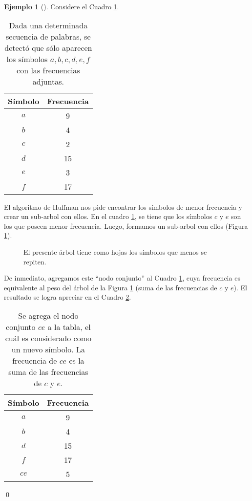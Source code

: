 \documentclass[english, spanish, fleqn, 10pt]{article}
\newcommand{\comillas}[1]{``#1''}
\numberwithin{equation}{section}
\theoremstyle{definition}
\newtheorem{beforeExample}{Ejemplo}[section]
\newenvironment{ejemplo}[1][]{\begin{beforeExample}[#1]\renewcommand{\qedsymbol}{$\blacksquare$}}{\qed\end{beforeExample}}
\begin{document}
\begin{ejemplo}
	Considere el Cuadro \ref{09::CuadroEjemplo1}.
	\begin{table}[!h]
		\centering
		\begin{tabular}{c|c}
			Símbolo&Frecuencia\\
			\hline
			$a$&9\\
			$b$&4\\
			$c$&2\\
			$d$&15\\
			$e$&3\\
			$f$&17
		\end{tabular}
		\caption{Dada una determinada secuencia de palabras, se detectó que sólo aparecen los símbolos $a, b, c, d, e, f$ con las frecuencias adjuntas.}
		\label{09::CuadroEjemplo1}
	\end{table}
	El algoritmo de Huffman nos pide encontrar los símbolos de menor frecuencia y crear un sub-arbol con ellos. En el cuadro \ref{09::CuadroEjemplo1}, se tiene que los símbolos $c$ y $e$ son los que poseen menor frecuencia. Luego, formamos un sub-arbol con ellos (Figura \ref{09::EjemploArbol1}).
	\begin{figure}[!h]
		\centering
		\caption{El presente árbol tiene como hojas los símbolos que menos se repiten.}
		\label{09::EjemploArbol1}
	\end{figure}
	
	De inmediato, agregamos este \comillas{nodo conjunto} al Cuadro \ref{09::CuadroEjemplo1}, cuya frecuencia es equivalente al peso del árbol de la Figura \ref{09::EjemploArbol1} (suma de las frecuencias de $c$ y $e$). El resultado se logra apreciar en el Cuadro \ref{09::CuadroEjemplo2}.
	\begin{table}[!h]
		\centering
	\begin{tabular}{c|c}
		Símbolo&Frecuencia\\
		\hline
		$a$&9\\
		$b$&4\\
		$d$&15\\
		$f$&17\\
		$ce$&5
	\end{tabular}
	\caption{Se agrega el nodo conjunto $ce$ a la tabla, el cuál es considerado como un nuevo símbolo. La frecuencia de $ce$ es la suma de las frecuencias de $c$ y $e$.}
	\label{09::CuadroEjemplo2}
\end{table}


\end{ejemplo}
\end{document}
